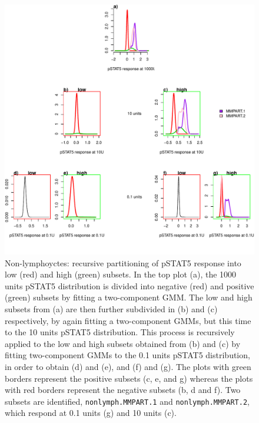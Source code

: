 %
\begin{figure}[!h]
\centering
\includegraphics[scale=.7]{figures/mmpart-nonlymphocytes-tree}
{ Non-lymphoyctes: recursive partitioning of pSTAT5 response into low (red) and high (green) subsets. }
{
    In the top plot (a), the 1000 units pSTAT5 distribution is divided into negative (red) and positive (green) subsets by fitting a two-component \gls{GMM}.
    The low and high subsets from (a) are then further subdivided in (b) and (c) respectively, by again fitting a two-component \glspl{GMM},
    but this time to the 10 units pSTAT5 distribution.
    This process is recursively applied to the low and high subsets obtained from (b) and (c) by fitting two-component \glspl{GMM} to the 0.1 units pSTAT5 distribution, in order
    to obtain (d) and (e), and (f) and (g).
    The plots with green borders represent the positive subsets (c, e, and g) whereas the plots with red borders represent the negative subsets (b, d and f).
    Two subsets are identified, \texttt{nonlymph.MMPART.1} and \texttt{nonlymph.MMPART.2}, which respond at 0.1 units (g) and 10 units (c).
}
\end{figure}


